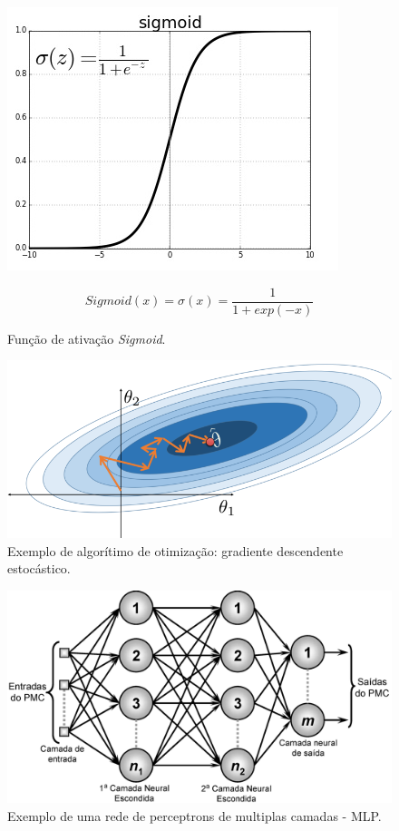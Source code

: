 \begin{figure}[!ht]
    \centering
    \begin{minipage}[c]{0.4\textwidth}
        \includegraphics[width=\columnwidth]{Imagens/sigmoid-activation-function.jpg}
        \caption{Função de ativação \textit{Sigmoid}.}
    \end{minipage}%
    \begin{minipage}{0.5\textwidth}
        \begin{equation} Sigmoid(x) = \sigma(x) = \frac{1} {1+ exp(-x)}\end{equation}
    \end{minipage}       
    \label{fig:sigmoid}
\end{figure}


\begin{figure}[!ht]
    \centering
        \includegraphics[width=0.47\columnwidth]{Imagens/stochastic_gradient_descent.PNG}
    \caption{Exemplo de algorítimo de otimização: gradiente descendente estocástico. }
    \label{fig:SGD}
\end{figure}






\begin{figure}[!ht]
    \centering
    \includegraphics[width=0.6\columnwidth]{
        Imagens/RedeNeural.PNG
    }
    \caption{Exemplo de uma rede de perceptrons de multiplas camadas - MLP.}
    \label{fig:ann}
\end{figure}
